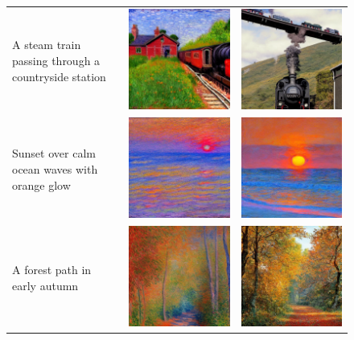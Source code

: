 \begin{figure}[htb]
\begin{tabular}{p{4.5cm}c@{\hskip 0.5cm}c}
A steam train passing through a countryside station &
\includegraphics[width=0.25\linewidth]{modelo_base/08_a_steam_train_passing_through_.png} &
\includegraphics[width=0.25\linewidth]{modelo_lora/08_a_steam_train_passing_through_.png} \\

Sunset over calm ocean waves with orange glow &
\includegraphics[width=0.25\linewidth]{modelo_base/09_sunset_over_calm_ocean_waves_w.png} &
\includegraphics[width=0.25\linewidth]{modelo_lora/09_sunset_over_calm_ocean_waves_w.png} \\

A forest path in early autumn &
\includegraphics[width=0.25\linewidth]{modelo_base/10_a_forest_path_in_early_autumn.png} &
\includegraphics[width=0.25\linewidth]{modelo_lora/10_a_forest_path_in_early_autumn.png} \\

\bottomrule
\end{tabular}
\end{figure}